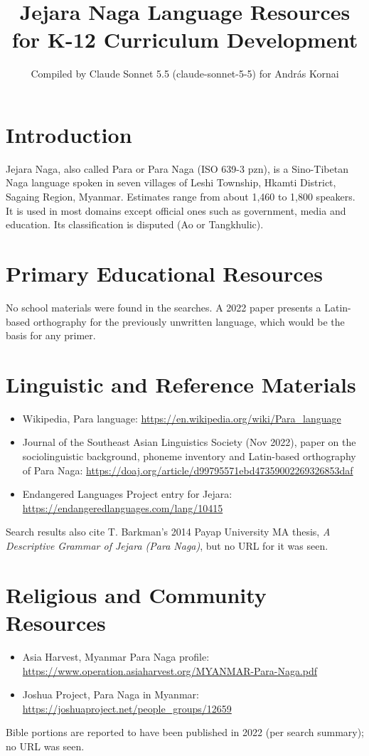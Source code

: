 \documentclass[12pt]{article}
\title{Jejara Naga Language Resources for K-12 Curriculum Development}
\author{Compiled by Claude Sonnet 5.5 (claude-sonnet-5-5) for Andr\'as Kornai}
\date{}
\begin{document}
\maketitle

\section{Introduction}
Jejara Naga, also called Para or Para Naga (ISO 639-3 pzn), is a Sino-Tibetan Naga language spoken in seven villages of Leshi Township, Hkamti District, Sagaing Region, Myanmar. Estimates range from about 1,460 to 1,800 speakers. It is used in most domains except official ones such as government, media and education. Its classification is disputed (Ao or Tangkhulic).

\section{Primary Educational Resources}
No school materials were found in the searches. A 2022 paper presents a Latin-based orthography for the previously unwritten language, which would be the basis for any primer.

\section{Linguistic and Reference Materials}
\begin{itemize}
\item Wikipedia, Para language: \url{https://en.wikipedia.org/wiki/Para_language}
\item Journal of the Southeast Asian Linguistics Society (Nov 2022), paper on the sociolinguistic background, phoneme inventory and Latin-based orthography of Para Naga: \url{https://doaj.org/article/d99795571ebd47359002269326853daf}
\item Endangered Languages Project entry for Jejara: \url{https://endangeredlanguages.com/lang/10415}
\end{itemize}
Search results also cite T. Barkman's 2014 Payap University MA thesis, \emph{A Descriptive Grammar of Jejara (Para Naga)}, but no URL for it was seen.

\section{Religious and Community Resources}
\begin{itemize}
\item Asia Harvest, Myanmar Para Naga profile: \url{https://www.operation.asiaharvest.org/MYANMAR-Para-Naga.pdf}
\item Joshua Project, Para Naga in Myanmar: \url{https://joshuaproject.net/people_groups/12659}
\end{itemize}
Bible portions are reported to have been published in 2022 (per search summary); no URL was seen.
\end{document}
